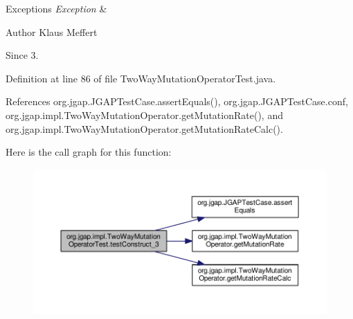 \begin{DoxyExceptions}{Exceptions}
{\em Exception} & \\
\hline
\end{DoxyExceptions}
\begin{DoxyAuthor}{Author}
Klaus Meffert 
\end{DoxyAuthor}
\begin{DoxySince}{Since}
3. 
\end{DoxySince}


Definition at line 86 of file Two\-Way\-Mutation\-Operator\-Test.\-java.



References org.\-jgap.\-J\-G\-A\-P\-Test\-Case.\-assert\-Equals(), org.\-jgap.\-J\-G\-A\-P\-Test\-Case.\-conf, org.\-jgap.\-impl.\-Two\-Way\-Mutation\-Operator.\-get\-Mutation\-Rate(), and org.\-jgap.\-impl.\-Two\-Way\-Mutation\-Operator.\-get\-Mutation\-Rate\-Calc().



Here is the call graph for this function\-:
\nopagebreak
\begin{figure}[H]
\begin{center}
\leavevmode
\includegraphics[width=350pt]{classorg_1_1jgap_1_1impl_1_1_two_way_mutation_operator_test_a726dc47baf5840268b9be1c488928a00_cgraph}
\end{center}
\end{figure}


